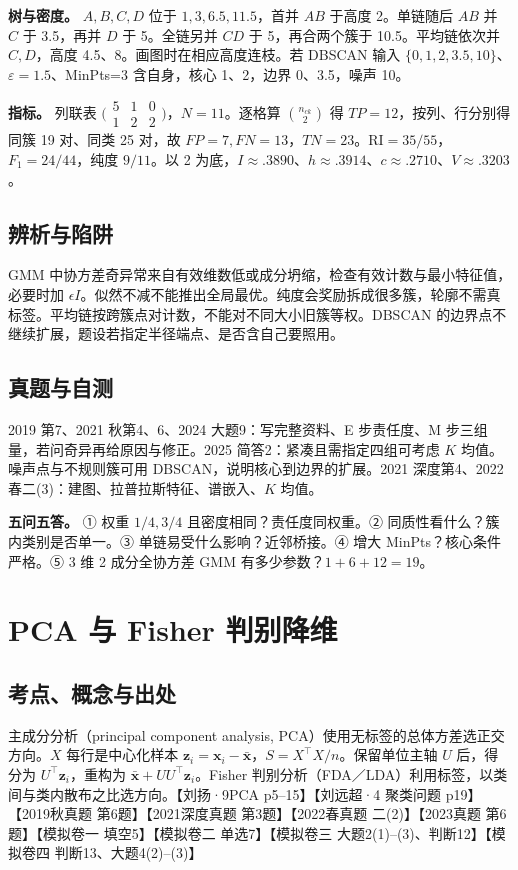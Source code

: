 \documentclass[UTF8,a4paper,zihao=-4,fontset=fandol]{ctexart}
\begin{document}
\textbf{树与密度。} $A,B,C,D$ 位于 $1,3,6.5,11.5$，首并 $AB$ 于高度 2。单链随后 $AB$ 并 $C$ 于 3.5，再并 $D$ 于 5。全链另并 $CD$ 于 5，再合两个簇于 10.5。平均链依次并 $C,D$，高度 4.5、8。画图时在相应高度连枝。若 DBSCAN 输入 $\{0,1,2,3.5,10\}$、$\varepsilon=1.5$、MinPts=3 含自身，核心 1、2，边界 0、3.5，噪声 10。

\textbf{指标。} 列联表 $\bigl(\begin{smallmatrix}5&1&0\\1&2&2\end{smallmatrix}\bigr)$，$N=11$。逐格算 $\binom{n_{ck}}2$ 得 $TP=12$，按列、行分别得同簇 19 对、同类 25 对，故 $FP=7,FN=13$，$TN=23$。$\mathrm{RI}=35/55$，$F_1=24/44$，纯度 $9/11$。以 2 为底，$I\approx.3890$、$h\approx.3914$、$c\approx.2710$、$V\approx.3203$。

\subsection{辨析与陷阱}
GMM 中协方差奇异常来自有效维数低或成分坍缩，检查有效计数与最小特征值，必要时加 $\epsilon I$。似然不减不能推出全局最优。纯度会奖励拆成很多簇，轮廓不需真标签。平均链按跨簇点对计数，不能对不同大小旧簇等权。DBSCAN 的边界点不继续扩展，题设若指定半径端点、是否含自己要照用。

\subsection{真题与自测}
2019 第7、2021 秋第4、6、2024 大题9：写完整资料、E 步责任度、M 步三组量，若问奇异再给原因与修正。2025 简答2：紧凑且需指定四组可考虑 $K$ 均值。噪声点与不规则簇可用 DBSCAN，说明核心到边界的扩展。2021 深度第4、2022 春二(3)：建图、拉普拉斯特征、谱嵌入、$K$ 均值。

\textbf{五问五答。} ① 权重 $1/4,3/4$ 且密度相同？责任度同权重。② 同质性看什么？簇内类别是否单一。③ 单链易受什么影响？近邻桥接。④ 增大 MinPts？核心条件严格。⑤ 3 维 2 成分全协方差 GMM 有多少参数？$1+6+12=19$。

\section{PCA 与 Fisher 判别降维}
\subsection{考点、概念与出处}
主成分分析（principal component analysis, PCA）使用无标签的总体方差选正交方向。\(X\) 每行是中心化样本 \(\bm z_i=\bm x_i-\bar{\bm x}\)，\(S=X^\top X/n\)。保留单位主轴 \(U\) 后，得分为 \(U^\top\bm z_i\)，重构为 \(\bar{\bm x}+UU^\top\bm z_i\)。Fisher 判别分析（FDA／LDA）利用标签，以类间与类内散布之比选方向。【刘扬·9PCA p5--15】【刘远超·4 聚类问题 p19】【2019秋真题 第6题】【2021深度真题 第3题】【2022春真题 二(2)】【2023真题 第6题】【模拟卷一 填空5】【模拟卷二 单选7】【模拟卷三 大题2(1)--(3)、判断12】【模拟卷四 判断13、大题4(2)--(3)】
\end{document}
